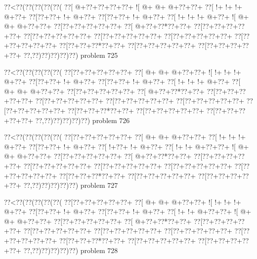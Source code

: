 \vbox{\vbox{\goo
\0??<\0??(\0??(\0??(\0??(\0??(
\0??[\- @+\0??+\0??+\0??+\0??+
\- ![\- @+\- @+\- @+\0??+\0??+
\0??[\- !+\- !+\- !+\- @+\0??+
\0??[\0??+\0??+\- !+\- @+\0??+
\0??[\0??+\0??+\- !+\- @+\0??+
\0??[\- !+\- !+\- !+\- @+\0??+
\- ![\- @+\- @+\- @+\0??+\0??+
\0??[\0??+\0??+\0??+\0??+\0??+
\0??[\- @+\0??+\0??*\0??+\0??+
\0??[\0??+\0??+\0??+\0??+\0??+
\0??[\0??+\0??+\0??+\0??+\0??+
\0??[\0??+\0??+\0??+\0??+\0??+
\0??[\0??+\0??+\0??+\0??+\0??+
\0??[\0??+\0??+\0??+\0??+\0??+
\0??[\0??+\0??+\0??*\0??+\0??+
\0??[\0??+\0??+\0??+\0??+\0??+
\0??[\0??+\0??+\0??+\0??+\0??+
\0??,\0??)\0??)\0??)\0??)\0??)
}
\hfil problem 725\hfil\break
}

\vbox{\vbox{\goo
\0??<\0??(\0??(\0??(\0??(\0??(
\0??[\0??+\0??+\0??+\0??+\0??+
\0??[\- @+\- @+\- @+\0??+\0??+
\- ![\- !+\- !+\- !+\- @+\0??+
\0??[\0??+\0??+\- !+\- @+\0??+
\0??[\0??+\0??+\- !+\- @+\0??+
\0??[\- !+\- !+\- !+\- @+\0??+
\0??[\- @+\- @+\- @+\0??+\0??+
\0??[\0??+\0??+\0??+\0??+\0??+
\0??[\- @+\0??+\0??*\0??+\0??+
\0??[\0??+\0??+\0??+\0??+\0??+
\0??[\0??+\0??+\0??+\0??+\0??+
\0??[\0??+\0??+\0??+\0??+\0??+
\0??[\0??+\0??+\0??+\0??+\0??+
\0??[\0??+\0??+\0??+\0??+\0??+
\0??[\0??+\0??+\0??*\0??+\0??+
\0??[\0??+\0??+\0??+\0??+\0??+
\0??[\0??+\0??+\0??+\0??+\0??+
\0??,\0??)\0??)\0??)\0??)\0??)
}
\hfil problem 726\hfil\break
}

\vbox{\vbox{\goo
\0??<\0??(\0??(\0??(\0??(\0??(
\0??[\0??+\0??+\0??+\0??+\0??+
\0??[\- @+\- @+\- @+\0??+\0??+
\0??[\- !+\- !+\- !+\- @+\0??+
\0??[\0??+\0??+\- !+\- @+\0??+
\0??[\- !+\0??+\- !+\- @+\0??+
\0??[\- !+\- !+\- @+\0??+\0??+
\- ![\- @+\- @+\- @+\0??+\0??+
\0??[\0??+\0??+\0??+\0??+\0??+
\0??[\- @+\0??+\0??*\0??+\0??+
\0??[\0??+\0??+\0??+\0??+\0??+
\0??[\0??+\0??+\0??+\0??+\0??+
\0??[\0??+\0??+\0??+\0??+\0??+
\0??[\0??+\0??+\0??+\0??+\0??+
\0??[\0??+\0??+\0??+\0??+\0??+
\0??[\0??+\0??+\0??*\0??+\0??+
\0??[\0??+\0??+\0??+\0??+\0??+
\0??[\0??+\0??+\0??+\0??+\0??+
\0??,\0??)\0??)\0??)\0??)\0??)
}
\hfil problem 727\hfil\break
}

\vbox{\vbox{\goo
\0??<\0??(\0??(\0??(\0??(\0??(
\0??[\0??+\0??+\0??+\0??+\0??+
\0??[\- @+\- @+\- @+\0??+\0??+
\- ![\- !+\- !+\- !+\- @+\0??+
\0??[\0??+\0??+\- !+\- @+\0??+
\0??[\0??+\0??+\- !+\- @+\0??+
\0??[\- !+\- !+\- @+\0??+\0??+
\- ![\- @+\- @+\- @+\0??+\0??+
\0??[\0??+\0??+\0??+\0??+\0??+
\0??[\- @+\0??+\0??*\0??+\0??+
\0??[\0??+\0??+\0??+\0??+\0??+
\0??[\0??+\0??+\0??+\0??+\0??+
\0??[\0??+\0??+\0??+\0??+\0??+
\0??[\0??+\0??+\0??+\0??+\0??+
\0??[\0??+\0??+\0??+\0??+\0??+
\0??[\0??+\0??+\0??*\0??+\0??+
\0??[\0??+\0??+\0??+\0??+\0??+
\0??[\0??+\0??+\0??+\0??+\0??+
\0??,\0??)\0??)\0??)\0??)\0??)
}
\hfil problem 728\hfil\break
}


